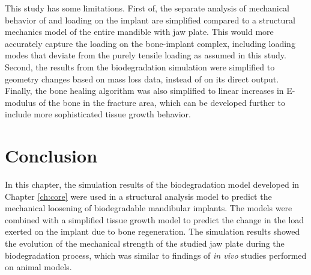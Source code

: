This study has some limitations. First of, the separate analysis of mechanical behavior of and loading on the implant are simplified compared to a structural mechanics model of the entire mandible with jaw plate. This would more accurately capture the loading on the bone-implant complex, including loading modes that deviate from the purely tensile loading as assumed in this study. Second, the results from the biodegradation simulation were simplified to geometry changes based on mass loss data, instead of on its direct output. Finally, the bone healing algorithm was also simplified to linear increases in E-modulus of the bone in the fracture area, which can be developed further to include more sophisticated tissue growth behavior.

\section{Conclusion}

In this chapter, the simulation results of the biodegradation model developed in Chapter \ref{ch:core} were used in a structural analysis model to predict the mechanical loosening of biodegradable mandibular implants. The models were combined with a simplified tissue growth model to predict the change in the load exerted on the implant due to bone regeneration. The simulation results showed the evolution of the mechanical strength of the studied jaw plate during the biodegradation process, which was similar to findings of \textit{in vivo} studies performed on animal models.

